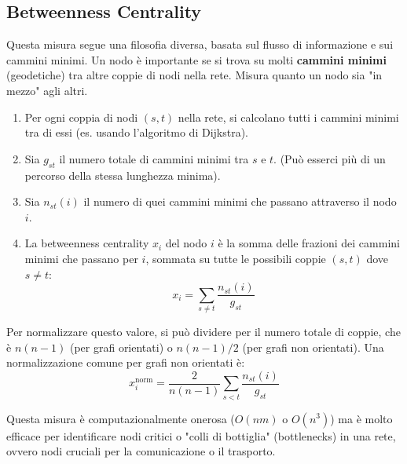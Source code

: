     
	\subsection{Betweenness Centrality}
	Questa misura segue una filosofia diversa, basata sul flusso di informazione e sui cammini minimi. Un nodo è importante se si trova su molti \textbf{cammini minimi} (geodetiche) tra altre coppie di nodi nella rete. Misura quanto un nodo sia "in mezzo" agli altri.

	\begin{enumerate}
		\item Per ogni coppia di nodi $(s, t)$ nella rete, si calcolano tutti i cammini minimi tra di essi (es. usando l'algoritmo di Dijkstra).
		\item Sia $g_{st}$ il numero totale di cammini minimi tra $s$ e $t$. (Può esserci più di un percorso della stessa lunghezza minima).
		\item Sia $n_{st}(i)$ il numero di quei cammini minimi che passano attraverso il nodo $i$.
		\item La betweenness centrality $x_i$ del nodo $i$ è la somma delle frazioni dei cammini minimi che passano per $i$, sommata su tutte le possibili coppie $(s, t)$ dove $s \neq t$:
        \begin{equation}
            x_i = \sum_{s \neq t} \frac{n_{st}(i)}{g_{st}}
        \end{equation}
		
	\end{enumerate}
	
	Per normalizzare questo valore, si può dividere per il numero totale di coppie, che è $n(n-1)$ (per grafi orientati) o $n(n-1)/2$ (per grafi non orientati). Una normalizzazione comune per grafi non orientati è:
    \begin{equation}
        x_i^{\text{norm}} = \frac{2}{n(n-1)} \sum_{s < t} \frac{n_{st}(i)}{g_{st}}
    \end{equation}
	
	Questa misura è computazionalmente onerosa ($O(nm)$ o $O(n^3)$) ma è molto efficace per identificare nodi critici o "colli di bottiglia" (bottlenecks) in una rete, ovvero nodi cruciali per la comunicazione o il trasporto.
	

